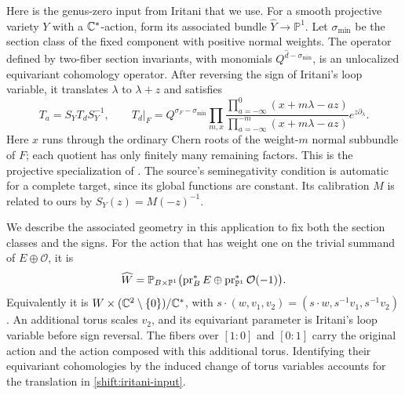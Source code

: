 Here is the genus-zero input from Iritani that we use.  For a smooth
projective variety $Y$ with a $\mathbb C^*$-action, form its associated bundle
$\widehat Y\to\mathbb P^1$.  Let $\sigma_{\min}$ be the section class
of the fixed component with positive normal weights.  The operator
defined by two-fiber section invariants, with monomials
$Q^{\widehat d-\sigma_{\min}}$, is an unlocalized equivariant
cohomology operator.  After reversing the sign of Iritani's loop
variable, it translates $\lambda$ to $\lambda+z$ and satisfies
\begin{equation}
 T_a=S_YT_dS_Y^{-1},\qquad
 T_d\big|_{F}
 =Q^{\sigma_F-\sigma_{\min}}
   \prod_{m,x}
   \frac{\prod_{a=-\infty}^{0}(x+m\lambda-az)}
        {\prod_{a=-\infty}^{-m}(x+m\lambda-az)}
    e^{z\partial_\lambda}.
 \label{shift:iritani-input}
\end{equation}
Here $x$ runs through the ordinary Chern roots of the weight-$m$
normal subbundle of $F$; each quotient has only finitely many remaining
factors.  This is the projective specialization of
\cite[Proposition~2.2, Remark~3.4, Definition~3.9,
Remark~3.10, Definition~3.13, and
Theorem~3.14]{IritaniShift}.  The source's seminegativity condition is
automatic for a complete target, since its global functions are
constant.  Its calibration $M$ is related to ours by
$S_Y(z)=M(-z)^{-1}$.

We describe the associated geometry in this application to fix both
the section classes and the signs.  For the action that has weight one
on the trivial summand of $E\oplus\mathcal O$, it is
\begin{equation}
 \widehat W
  =\mathbb P_{B\times\mathbb P^1}
     \bigl(\operatorname{pr}_B^*E\oplus\operatorname{pr}_{\mathbb P^1}^*\mathcal O(-1)\bigr).
 \label{shift:associated-space}
\end{equation}
Equivalently it is
$W\times(\mathbb C^2\setminus\{0\})/\mathbb C^*$, with
$s\cdot(w,v_1,v_2)=(s\cdot w,s^{-1}v_1,s^{-1}v_2)$.
An additional torus scales $v_2$, and its equivariant parameter is
Iritani's loop variable before sign reversal.  The fibers over
$[1:0]$ and $[0:1]$ carry the original action and the action composed
with this additional torus.  Identifying their equivariant
cohomologies by the induced change of torus variables accounts for
the translation in \eqref{shift:iritani-input}.

